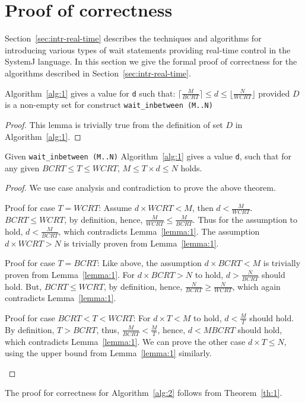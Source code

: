 \section{Proof of correctness}
\label{sec:proof-correctness}

Section~\ref{sec:intr-real-time} describes the techniques and algorithms
for introducing various types of wait statements providing real-time
control in the SystemJ language. In this section we give the formal
proof of correctness for the algorithms described in
Section~\ref{sec:intr-real-time}.

\begin{lemma}
  Algorithm~\ref{alg:1} gives a value for \texttt{d} such that: $\lceil
  \frac{M}{BCRT} \rceil \leq d \leq \lfloor \frac{N}{WCRT} \rfloor$
  provided $D$ is a non-empty set for construct \texttt{wait\_inbetween
    (M..N)}
\label{lemma:1}
\end{lemma}
\begin{proof}
  This lemma is trivially true from the definition of set $D$ in
  Algorithm~\ref{alg:1}.
\end{proof}

\begin{theorem}
 Given \texttt{wait\_inbetween (M..N)} Algorithm~\ref{alg:1} gives a
 value \texttt{d}, such that for any given $BCRT \leq T \leq WCRT$,
 $M \leq T \times d \leq N$ holds.
\label{th:1}
\end{theorem}
\begin{proof}
  We use case analysis and contradiction to prove the above theorem.
  \begin{compactenum}[\hspace{0.25cm} 1.]
  \item Proof for case $T = WCRT$: Assume \mbox{$d \times WCRT < M$},
    then $d < \frac{M}{WCRT}$. $BCRT \leq WCRT$, by definition, hence,
    $\frac{M}{WCRT} \leq \frac{M}{BCRT}$. Thus for the assumption to
    hold, $d < \frac{M}{BCRT}$, which contradicts
    Lemma~\ref{lemma:1}. The assumption $d \times WCRT >N$ is trivially
    proven from Lemma~\ref{lemma:1}.
  \item Proof for case $T = BCRT$: Like above, the assumption $d \times
    BCRT < M$ is trivially proven from Lemma~\ref{lemma:1}. For $d
    \times BCRT > N$ to hold, $d > \frac{N}{BCRT}$ should hold. But,
    $BCRT \leq WCRT$, by definition, hence, $\frac{N}{BCRT} \geq
    \frac{N}{WCRT}$, which again contradicts Lemma~\ref{lemma:1}.
  \item Proof for case $BCRT < T < WCRT$: For $d \times T < M$ to hold,
    $d < \frac{M}{T}$ should hold. By definition, $T > BCRT$, thus,
    $\frac{M}{BCRT} < \frac{M}{T}$, hence, $d < {M}{BCRT}$ should hold,
    which contradicts Lemma~\ref{lemma:1}. We can prove the other case
    $d \times T \leq N$, using the upper bound from Lemma~\ref{lemma:1}
    similarly.
  \end{compactenum}
\end{proof}

The proof for correctness for Algorithm~\ref{alg:2} follows from
Theorem~\ref{th:1}.



